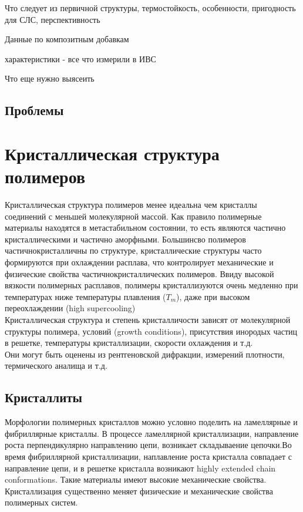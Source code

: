 Что следует из первичной структуры, термостойкость, особенности, пригодность для СЛС, перспективность

Данные по композитным добавкам

характеристики - все что измерили в ИВС

Что еще нужно выясеить

\subsection{Проблемы}



\section{Кристаллическая структура полимеров}
Кристаллическая структура полимеров менее идеальна чем кристаллы соединений с меньшей молекулярной массой. Как правило полимерные материалы находятся в метастабильном состоянии, то есть являются частично кристаллическими и частично аморфными. Большинсво полимеров частичнокристалличны по структуре, кристаллические структуры часто формируются при охлаждении расплава, что контролирует механические и физические свойства частичнокристаллических полимеров. Ввиду высокой вязкости полимерных расплавов, полимеры кристаллизуются очень медленно при температурах ниже температуры плавления ($T_m$), даже при высоком переохлаждении (high supercooling)
\\
Кристаллическая структура и степень кристалличости зависят от молекулярной структуры полимера, условий (growth
conditions), присутствия инородых частиц в решетке, температуры кристаллизации, скорости охлаждения и т.д.\\
Они могут быть оценены из рентгеновской дифракции, измерений плотности, термического аналища и т.д.

\subsection{Кристаллиты}
Морфологии полимерных кристаллов можно условно поделить на ламеллярные и фибриллярные кристаллы. В процессе ламеллярной кристаллизации, направление роста перпендикулярно направлению цепи, возникает складываение цепочки.Во время фибриллярной кристаллизации, наплавление роста кристалла совпадает с направление цепи, и в решетке кристалла возникают highly extended chain conformations. Такие материалы имеют высокие механические свойства. Кристаллизация существенно меняет физические и механические свойства полимерных систем. \\

